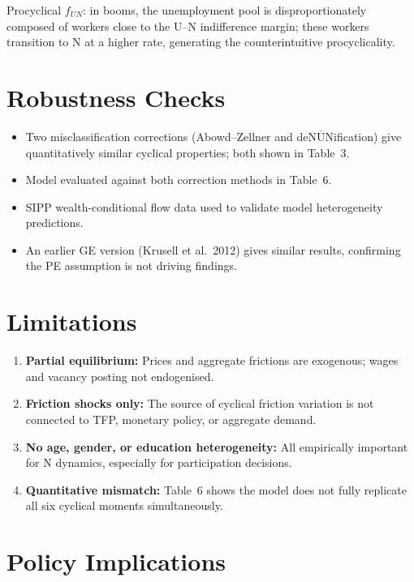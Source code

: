 Procyclical $f_{UN}$: in booms, the unemployment pool is disproportionately
composed of workers close to the U--N indifference margin; these workers
transition to N at a higher rate, generating the counterintuitive procyclicality.

\section{Robustness Checks}

\begin{itemize}
  \item Two misclassification corrections (Abowd--Zellner and
    de$\overline{\text{NUN}}$ification) give quantitatively similar cyclical
    properties; both shown in Table~3.
  \item Model evaluated against both correction methods in Table~6.
  \item SIPP wealth-conditional flow data used to validate model heterogeneity
    predictions.
  \item An earlier GE version (Krusell et al.\ 2012) gives similar results,
    confirming the PE assumption is not driving findings.
\end{itemize}

\section{Limitations}

\begin{enumerate}
  \item \textbf{Partial equilibrium:} Prices and aggregate frictions are
    exogenous; wages and vacancy posting not endogenised.
  \item \textbf{Friction shocks only:} The source of cyclical friction
    variation is not connected to TFP, monetary policy, or aggregate demand.
  \item \textbf{No age, gender, or education heterogeneity:} All empirically
    important for N dynamics, especially for participation decisions.
  \item \textbf{Quantitative mismatch:} Table~6 shows the model does not
    fully replicate all six cyclical moments simultaneously.
\end{enumerate}

\section{Policy Implications}

